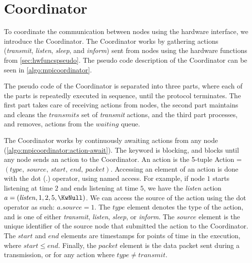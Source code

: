 \section{Coordinator}\label{sec:coordinator}
To coordinate the communication between nodes using the hardware interface, we introduce the Coordinator. The
Coordinator works by gathering actions (\textit{transmit}, \textit{listen}, \textit{sleep}, and
\textit{inform}) sent from nodes using the hardware functions from \autoref{sec:hwfuncspseudo}. The pseudo
code description of the Coordinator can be seen in \autoref{algo:mpicoordinator}. \medbreak

The pseudo code of the Coordinator is separated into three parts, where each of the parts is repeatedly
executed in sequence, until the protocol terminates. The first part takes care of receiving actions from
nodes, the second part maintains and cleans the $\mathit{transmits}$ set of \textit{transmit} actions, and the
third part processes, and removes, actions from the $\mathit{waiting}$ queue. \medbreak

The Coordinator works by continuously awaiting actions from any node
(\autoref{algo:mpicoordinator:action-await}). The \KwAwait keyword is blocking, and blocks until any node
sends an action to the Coordinator. An action is the 5-tuple Action = $(\mathit{type},\ \mathit{source},\
\mathit{start},\ \mathit{end},\ \mathit{packet})$. Accessing an element of an action is done with the dot
($.$) operator, using named access. For example, if node $1$ starts listening at time $2$ and ends listening
at time $5$, we have the \textit{listen} action $a = (\mathit{listen}, 1, 2, 5, \KwNull)$. We can access the
source of the action using the dot operator as such: $a.source = 1$. The $\mathit{type}$ element denotes the
type of the action, and is one of either \textit{transmit}, \textit{listen}, \textit{sleep}, or
\textit{inform}. The $\mathit{source}$ element is the unique identifier of the source node that submitted the
action to the Coordinator. The $\mathit{start}$ and $\mathit{end}$ elements are timestamps for points of time
in the execution, where $\mathit{start} \leq \mathit{end}$. Finally, the $\mathit{packet}$ element is the data
packet sent during a transmission, or \KwNull for any action where $\mathit{type} \neq \mathit{transmit}$.
\medbreak

